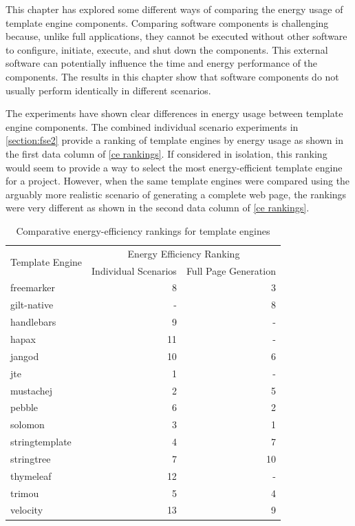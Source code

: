 This chapter has explored some different ways of comparing the energy usage of template engine components. Comparing software components is challenging because, unlike full applications, they cannot be executed without other software to configure, initiate, execute, and shut down the components. This external software can potentially influence the time and energy performance of the components. The results in this chapter show that software components do not usually perform identically in different scenarios. 

The experiments have shown clear differences in energy usage between template engine components. The combined individual scenario experiments in \autoref{section:fse2} provide a ranking of template engines by energy usage as shown in the first data column of \autoref{ce rankings}. If considered in isolation, this ranking would seem to provide a way to select the most energy-efficient template engine for a project. However, when the same template engines were compared using the arguably more realistic scenario of generating a complete web page, the rankings were very different as shown in the second data column of \autoref{ce rankings}.

\begin{table}[ht!]
\centering
\begin{tabular}{lrr}
\multirow{2}{*}{Template Engine} 
      & \multicolumn{2}{c}{Energy Efficiency Ranking} \\
& Individual Scenarios & Full Page Generation \\
\hline
freemarker & 8 & 3 \\
gilt-native & - & 8 \\
handlebars & 9 & - \\
hapax & 11 & -\\
jangod & 10 & 6 \\
jte & 1 & - \\
mustachej & 2 & 5 \\
pebble & 6 & 2 \\
solomon & 3 & 1 \\
stringtemplate & 4 & 7 \\
stringtree & 7 & 10 \\
thymeleaf & 12 & - \\
trimou & 5 & 4 \\
velocity & 13 & 9 \\
\end{tabular}
\caption{Comparative energy-efficiency rankings for template engines\label{ce rankings}}
\end{table}

